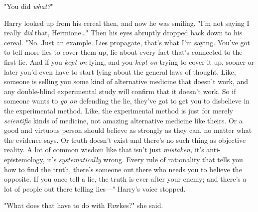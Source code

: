 "You did \emph{what?}"

Harry looked up from his cereal then, and now he was smiling. "I'm not saying I 
really \emph{did} that, Hermione{\ldots}" Then his eyes abruptly dropped back 
down to his cereal. "No. Just an example. Lies propagate, that's what I'm 
saying. You've got to tell more lies to cover them up, lie about every fact 
that's connected to the first lie. And if you \emph{kept on} lying, and you 
\emph{kept on} trying to cover it up, sooner or later you'd even have to start 
lying about the general laws of thought. Like, someone is selling you some kind 
of alternative medicine that doesn't work, and any double-blind experimental 
study will confirm that it doesn't work. So if someone wants to \emph{go on} 
defending the lie, they've got to get you to disbelieve in the experimental 
method. Like, the experimental method is just for merely \emph{scientific} 
kinds of medicine, not amazing alternative medicine like theirs. Or a good and 
virtuous person should believe as strongly as they can, no matter what the 
evidence says. Or truth doesn't exist and there's no such thing as objective 
reality. A lot of common wisdom like that isn't just \emph{mistaken,} it's 
anti-epistemology, it's \emph{systematically} wrong. Every rule of rationality 
that tells you how to find the truth, there's someone out there who needs you 
to believe the opposite. If you once tell a lie, the truth is ever after your 
enemy; and there's a lot of people out there telling lies---" Harry's voice 
stopped.

"What does that have to do with Fawkes?" she said.

